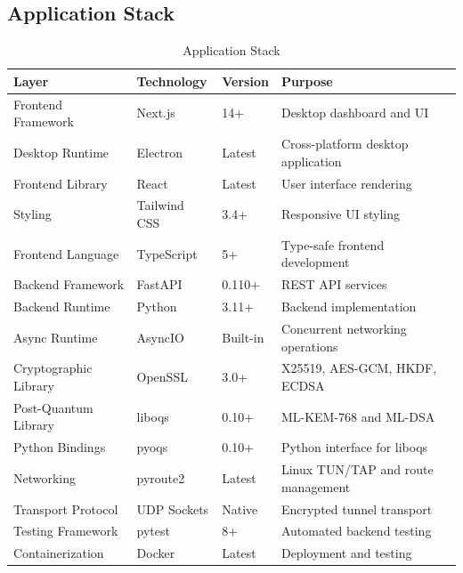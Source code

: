 \subsection{Application Stack}

\begin{table}[H]
\centering
\begin{tabular}{|l|l|l|p{4cm}|}
\hline
\textbf{Layer} & \textbf{Technology} & \textbf{Version} & \textbf{Purpose} \\ \hline

Frontend Framework & Next.js & 14+ & Desktop dashboard and UI \\ \hline

Desktop Runtime & Electron & Latest & Cross-platform desktop application \\ \hline

Frontend Library & React & Latest & User interface rendering \\ \hline

Styling & Tailwind CSS & 3.4+ & Responsive UI styling \\ \hline

Frontend Language & TypeScript & 5+ & Type-safe frontend development \\ \hline

Backend Framework & FastAPI & 0.110+ & REST API services \\ \hline

Backend Runtime & Python & 3.11+ & Backend implementation \\ \hline

Async Runtime & AsyncIO & Built-in & Concurrent networking operations \\ \hline

Cryptographic Library & OpenSSL & 3.0+ & X25519, AES-GCM, HKDF, ECDSA \\ \hline

Post-Quantum Library & liboqs & 0.10+ & ML-KEM-768 and ML-DSA \\ \hline

Python Bindings & pyoqs & 0.10+ & Python interface for liboqs \\ \hline

Networking & pyroute2 & Latest & Linux TUN/TAP and route management \\ \hline

Transport Protocol & UDP Sockets & Native & Encrypted tunnel transport \\ \hline

Testing Framework & pytest & 8+ & Automated backend testing \\ \hline

Containerization & Docker & Latest & Deployment and testing \\ \hline

\end{tabular}
\caption{Application Stack}
\end{table}

